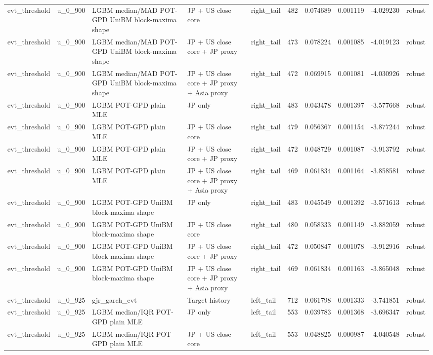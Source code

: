 \begin{tabular}{lll l lrrrrl}
evt\_threshold & u\_0\_900 & LGBM median/MAD POT-GPD UniBM block-maxima shape & JP + US close core & right\_tail & 482 & 0.074689 & 0.001119 & -4.029230 & robust \\
evt\_threshold & u\_0\_900 & LGBM median/MAD POT-GPD UniBM block-maxima shape & JP + US close core + JP proxy & right\_tail & 473 & 0.078224 & 0.001085 & -4.019123 & robust \\
evt\_threshold & u\_0\_900 & LGBM median/MAD POT-GPD UniBM block-maxima shape & JP + US close core + JP proxy + Asia proxy & right\_tail & 472 & 0.069915 & 0.001081 & -4.030926 & robust \\
evt\_threshold & u\_0\_900 & LGBM POT-GPD plain MLE & JP only & right\_tail & 483 & 0.043478 & 0.001397 & -3.577668 & robust \\
evt\_threshold & u\_0\_900 & LGBM POT-GPD plain MLE & JP + US close core & right\_tail & 479 & 0.056367 & 0.001154 & -3.877244 & robust \\
evt\_threshold & u\_0\_900 & LGBM POT-GPD plain MLE & JP + US close core + JP proxy & right\_tail & 472 & 0.048729 & 0.001087 & -3.913792 & robust \\
evt\_threshold & u\_0\_900 & LGBM POT-GPD plain MLE & JP + US close core + JP proxy + Asia proxy & right\_tail & 469 & 0.061834 & 0.001164 & -3.858581 & robust \\
evt\_threshold & u\_0\_900 & LGBM POT-GPD UniBM block-maxima shape & JP only & right\_tail & 483 & 0.045549 & 0.001392 & -3.571613 & robust \\
evt\_threshold & u\_0\_900 & LGBM POT-GPD UniBM block-maxima shape & JP + US close core & right\_tail & 480 & 0.058333 & 0.001149 & -3.882059 & robust \\
evt\_threshold & u\_0\_900 & LGBM POT-GPD UniBM block-maxima shape & JP + US close core + JP proxy & right\_tail & 472 & 0.050847 & 0.001078 & -3.912916 & robust \\
evt\_threshold & u\_0\_900 & LGBM POT-GPD UniBM block-maxima shape & JP + US close core + JP proxy + Asia proxy & right\_tail & 469 & 0.061834 & 0.001163 & -3.865048 & robust \\
evt\_threshold & u\_0\_925 & gjr\_garch\_evt & Target history & left\_tail & 712 & 0.061798 & 0.001333 & -3.741851 & robust \\
evt\_threshold & u\_0\_925 & LGBM median/IQR POT-GPD plain MLE & JP only & left\_tail & 553 & 0.039783 & 0.001368 & -3.696347 & robust \\
evt\_threshold & u\_0\_925 & LGBM median/IQR POT-GPD plain MLE & JP + US close core & left\_tail & 553 & 0.048825 & 0.000987 & -4.040548 & robust \\

\end{tabular}
